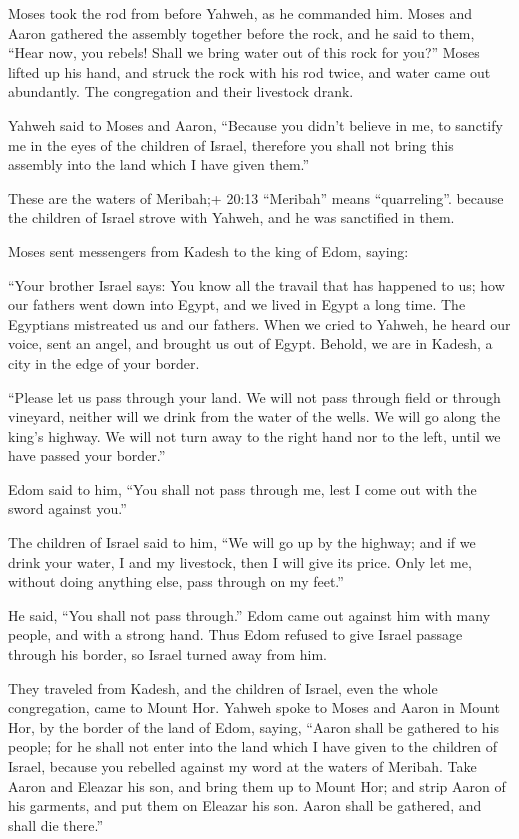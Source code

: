  Moses took the rod from before Yahweh, as he commanded him.
 Moses and Aaron gathered the assembly together before the
rock, and he said to them, ``Hear now, you rebels! Shall we bring water
out of this rock for you?''  Moses lifted up his hand, and
struck the rock with his rod twice, and water came out abundantly. The
congregation and their livestock drank.

 Yahweh said to Moses and Aaron, ``Because you didn't
believe in me, to sanctify me in the eyes of the children of Israel,
therefore you shall not bring this assembly into the land which I have
given them.''

 These are the waters of Meribah;+ 20:13 ``Meribah'' means
``quarreling''. because the children of Israel strove with Yahweh, and
he was sanctified in them.

 Moses sent messengers from Kadesh to the king of Edom,
saying:

``Your brother Israel says: You know all the travail that has happened
to us;  how our fathers went down into Egypt, and we lived
in Egypt a long time. The Egyptians mistreated us and our fathers.
 When we cried to Yahweh, he heard our voice, sent an
angel, and brought us out of Egypt. Behold, we are in Kadesh, a city in
the edge of your border.

 ``Please let us pass through your land. We will not pass
through field or through vineyard, neither will we drink from the water
of the wells. We will go along the king's highway. We will not turn away
to the right hand nor to the left, until we have passed your border.''

 Edom said to him, ``You shall not pass through me, lest I
come out with the sword against you.''

 The children of Israel said to him, ``We will go up by the
highway; and if we drink your water, I and my livestock, then I will
give its price. Only let me, without doing anything else, pass through
on my feet.''

 He said, ``You shall not pass through.'' Edom came out
against him with many people, and with a strong hand.  Thus
Edom refused to give Israel passage through his border, so Israel turned
away from him.

 They traveled from Kadesh, and the children of Israel,
even the whole congregation, came to Mount Hor.  Yahweh
spoke to Moses and Aaron in Mount Hor, by the border of the land of
Edom, saying,  ``Aaron shall be gathered to his people; for
he shall not enter into the land which I have given to the children of
Israel, because you rebelled against my word at the waters of Meribah.
 Take Aaron and Eleazar his son, and bring them up to Mount
Hor;  and strip Aaron of his garments, and put them on
Eleazar his son. Aaron shall be gathered, and shall die there.''

